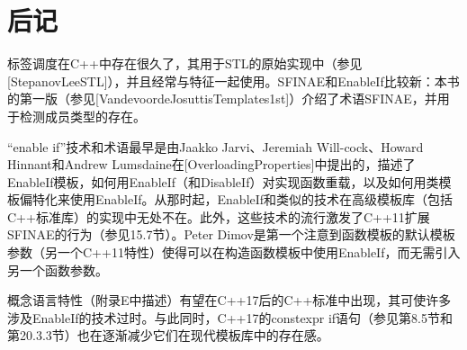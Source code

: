 \section{后记}
标签调度在C++中存在很久了，其用于STL的原始实现中（参见[StepanovLeeSTL]），并且经常与特征一起使用。SFINAE和EnableIf比较新：本书的第一版（参见[VandevoordeJosuttisTemplates1st]）介绍了术语SFINAE，并用于检测成员类型的存在。

“enable if”技术和术语最早是由Jaakko Jarvi、Jeremiah Will-cock、Howard Hinnant和Andrew Lumsdaine在[OverloadingProperties]中提出的，描述了EnableIf模板，如何用EnableIf（和DisableIf）对实现函数重载，以及如何用类模板偏特化来使用EnableIf。从那时起，EnableIf和类似的技术在高级模板库（包括C++标准库）的实现中无处不在。此外，这些技术的流行激发了C++11扩展SFINAE的行为（参见15.7节）。Peter Dimov是第一个注意到函数模板的默认模板参数（另一个C++11特性）使得可以在构造函数模板中使用EnableIf，而无需引入另一个函数参数。

概念语言特性（附录E中描述）有望在C++17后的C++标准中出现，其可使许多涉及EnableIf的技术过时。与此同时，C++17的constexpr if语句（参见第8.5节和第20.3.3节）也在逐渐减少它们在现代模板库中的存在感。